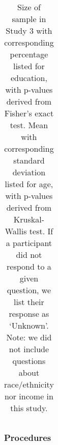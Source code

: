 \documentclass[letterpaper, nobind]{templates/ociamthesis}
\begin{document}
\begin{table}[ht]
\centering
\begingroup\fontsize{0.1pt}{0.1pt}\selectfont
\begin{tabular}{r}
   \\ 
 \end{tabular}
\endgroup
\caption{Size of sample in Study 3 with corresponding percentage listed for education, with p-values derived from Fisher’s exact test. Mean with corresponding standard deviation listed for age, with p-values derived from Kruskal-Wallis test. If a participant did not respond to a given question, we list their response as ‘Unknown’. Note: we did not include questions about race/ethnicity nor income in this study.} 
\label{tab:demographics-table-gender-study4}
\end{table}

\hypertarget{procedures-2}{%
\subsubsection{Procedures}\label{procedures-2}}
\end{document}
